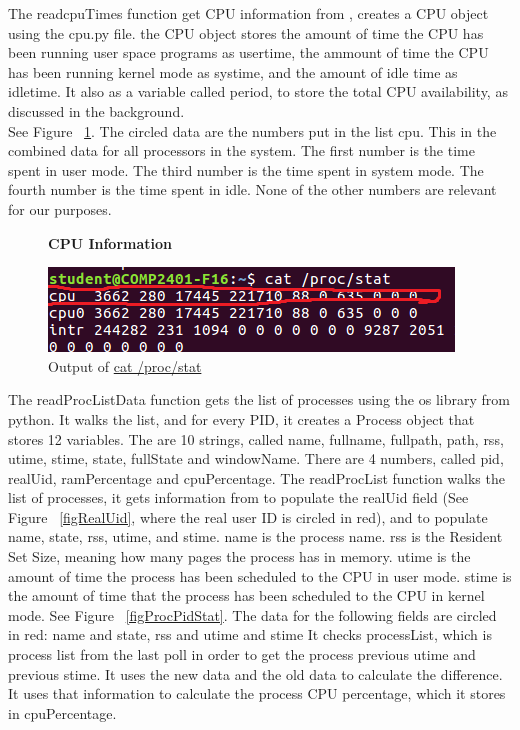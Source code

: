 \documentclass[12pt]{article}
\begin{document}
The readcpuTimes function get CPU information from , creates a CPU object using the cpu.py file. the CPU object stores the amount of time the CPU has been running user space programs as usertime, the ammount of time the CPU has been running kernel mode as systime, and the amount of idle time as idletime.
It also as a variable called period, to store the total CPU availability, as discussed in the background.\\
See Figure ~\ref{figCPUInfo}.
The circled data are the numbers put in the list cpu.
This in the combined data for all processors in the system.
The first number is the time spent in user mode.
The third number is the time spent in system mode.
The fourth number is the time spent in idle.
None of the other numbers are relevant for our purposes.\\
\begin{figure}[h]
	\centering
	\textbf{CPU Information}\par\medskip
	\includegraphics{totalCPU}
	\caption{Output of \url{cat /proc/stat}}
	\label{figCPUInfo}
\end{figure}
The readProcListData function gets the list of processes using the os library from python. It walks the list, and for every PID, it creates a Process object that stores 12 variables. The are 10 strings, called name, fullname, fullpath, path, rss, utime, stime, state, fullState and windowName. There are 4 numbers, called pid, realUid, ramPercentage and cpuPercentage. The readProcList function walks the list of processes, it gets information from  to populate the realUid field (See Figure ~\ref{figRealUid}, where the real user ID is circled in red), and  to populate name, state, rss, utime, and stime. name is the process name. rss is the Resident Set Size, meaning how many pages the process has in memory. utime is the amount of time the process has been scheduled to the CPU in user mode. stime is the amount of time that the process has been scheduled to the CPU in kernel mode. See Figure ~\ref{figProcPidStat}. The data for the following fields are circled in red: name and state, rss and utime and stime It checks processList, which is process list from the last poll in order to get the process previous utime and previous stime. It uses the new data and the old data to calculate the difference. It uses that information to calculate the process CPU percentage, which it stores in cpuPercentage. 
\end{document}
